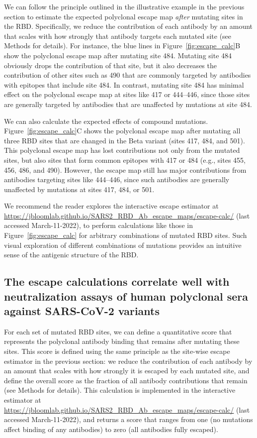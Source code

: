 \documentclass[9pt,twocolumn,twoside]{gsajnl_modified}
\begin{document}
We can follow the principle outlined in the illustrative example in the previous section to estimate the expected polyclonal escape map \emph{after} mutating sites in the RBD.
Specifically, we reduce the contribution of each antibody by an amount that scales with how strongly that antibody targets each mutated site (see Methods for details).
For instance, the blue lines in Figure~\ref{fig:escape_calc}B show the polyclonal escape map after mutating site 484.
Mutating site 484 obviously drops the contribution of that site, but it also decreases the contribution of other sites such as 490 that are commonly targeted by antibodies with epitopes that include site 484.
In contrast, mutating site 484 has minimal effect on the polyclonal escape map at sites like 417 or 444--446, since those sites are generally targeted by antibodies that are unaffected by mutations at site 484.

We can also calculate the expected effects of compound mutations.
Figure~\ref{fig:escape_calc}C shows the polyclonal escape map after mutating all three RBD sites that are changed in the Beta variant (sites 417, 484, and 501).
This polyclonal escape map has lost contributions not only from the mutated sites, but also sites that form common epitopes with 417 or 484 (e.g., sites 455, 456, 486, and 490).
However, the escape map still has major contributions from antibodies targeting sites like 444--446, since such antibodies are generally unaffected by mutations at sites 417, 484, or 501.

We recommend the reader explores the interactive escape estimator at \url{https://jbloomlab.github.io/SARS2_RBD_Ab_escape_maps/escape-calc/} (last accessed March-11-2022), to perform calculations like those in Figure~\ref{fig:escape_calc} for arbitrary combinations of mutated RBD sites.
Such visual exploration of different combinations of mutations provides an intuitive sense of the antigenic structure of the RBD.

\subsection{The escape calculations correlate well with neutralization assays of human polyclonal sera against SARS-CoV-2 variants}
For each set of mutated RBD sites, we can define a quantitative score that represents the polyclonal antibody binding that remains after mutating these sites.
This score is defined using the same principle as the site-wise escape estimator in the previous section: we reduce the contribution of each antibody by an amount that scales with how strongly it is escaped by each mutated site, and define the overall score as the fraction of all antibody contributions that remain (see Methods for details).
This calculation is implemented in the interactive estimator at \url{https://jbloomlab.github.io/SARS2_RBD_Ab_escape_maps/escape-calc/} (last accessed March-11-2022), and returns a score that ranges from one (no mutations affect binding of any antibodies) to zero (all antibodies fully escaped).
\end{document}
